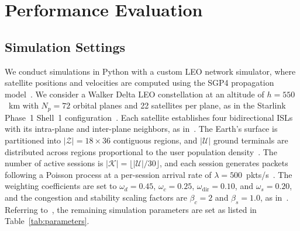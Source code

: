 \section{Performance Evaluation}
\label{sec:eval}

\subsection{Simulation Settings}
\label{sec:settings}

We conduct simulations in Python with a custom LEO network simulator, where satellite positions and velocities are computed using the SGP4 propagation model~\cite{wu2025enhancing}. We consider a Walker Delta LEO constellation at an altitude of $h = 550$~km with $N_p = 72$ orbital planes and 22 satellites per plane, as in the Starlink Phase~1 Shell~1 configuration~\cite{wu2025enhancing}. Each satellite establishes four bidirectional ISLs with its intra-plane and inter-plane neighbors, as in~\cite{zhang2025grlr, yao2025leo}.
The Earth's surface is partitioned into $|\mathcal{Z}| = 18 \times 36$ contiguous regions, and $|\mathcal{U}|$ ground terminals are distributed across regions proportional to the user population density~\cite{liu2024enabling}. The number of active sessions is $|\mathcal{K}| = \lfloor |\mathcal{U}| / 30 \rfloor$, and each session generates packets following a Poisson process at a per-session arrival rate of $\lambda = 500$~pkts/s~\cite{ran2024fully}. The weighting coefficients are set to $\omega_d = 0.45$, $\omega_c = 0.25$, $\omega_{\mathrm{dir}} = 0.10$, and $\omega_s = 0.20$, and the congestion and stability scaling factors are $\beta_c = 2$ and $\beta_s = 1.0$, as in~\cite{chen2025distributed}. Referring to~\cite{schulman2017proximal}, the remaining simulation parameters are set as listed in Table~\ref{tab:parameters}.

